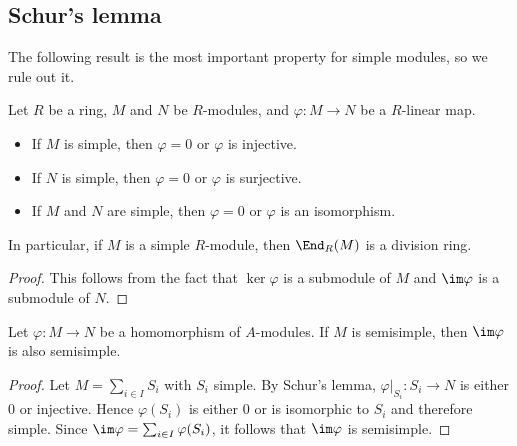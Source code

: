 \subsection{Schur's lemma}
The following result is the most important property for simple modules, so we rule out it.
\begin{theorem}
Let $R$ be a ring, $M$ and $N$ be $R$-modules, and $\varphi:M\to N$ be a $R$-linear map.
\begin{itemize}
\item If $M$ is simple, then $\varphi=0$ or $\varphi$ is injective.
\item If $N$ is simple, then $\varphi=0$ or $\varphi$ is surjective.
\item If $M$ and $N$ are simple, then $\varphi=0$ or $\varphi$ is an isomorphism.
\end{itemize}
In particular, if $M$ is a simple $R$-module, then $\End_R(M)$ is a division ring.
\end{theorem}
\begin{proof}
This follows from the fact that $\ker\varphi$ is a submodule of $M$ and $\im\varphi$ is a submodule of $N$.
\end{proof}
\begin{corollary}
Let $\varphi:M\to N$ be a homomorphism of $A$-modules. If $M$ is semisimple, then $\im\varphi$ is also semisimple.
\end{corollary}
\begin{proof}
Let $M=\sum_{i\in I}S_i$ with $S_i$ simple. By Schur's lemma, $\varphi|_{S_i}:S_i\to N$ is either $0$ or injective. Hence $\varphi(S_i)$ is either $0$ or is isomorphic to $S_i$ and therefore simple. Since $\im\varphi=\sum_{i\in I}\varphi(S_i)$, it follows that $\im\varphi$ is semisimple.
\end{proof}

